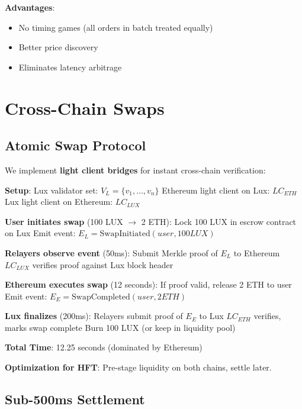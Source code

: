 \documentclass[11pt,letterpaper]{article}
\begin{document}
\textbf{Advantages}:
\begin{itemize}
    \item No timing games (all orders in batch treated equally)
    \item Better price discovery
    \item Eliminates latency arbitrage
\end{itemize}

\section{Cross-Chain Swaps}

\subsection{Atomic Swap Protocol}

We implement \textbf{light client bridges} for instant cross-chain verification:

\begin{algorithm}
\caption{Lux $\leftrightarrow$ Ethereum Atomic Swap}
\begin{algorithmic}
\STATE \textbf{Setup}:
\STATE Lux validator set: $V_L = \{v_1, \ldots, v_n\}$
\STATE Ethereum light client on Lux: $LC_{ETH}$
\STATE Lux light client on Ethereum: $LC_{LUX}$

\STATE \textbf{User initiates swap} (100 LUX $\to$ 2 ETH):
\STATE Lock 100 LUX in escrow contract on Lux
\STATE Emit event: $E_L = \text{SwapInitiated}(user, 100 LUX)$

\STATE \textbf{Relayers observe event} (50ms):
\STATE Submit Merkle proof of $E_L$ to Ethereum
\STATE $LC_{LUX}$ verifies proof against Lux block header

\STATE \textbf{Ethereum executes swap} (12 seconds):
\STATE If proof valid, release 2 ETH to user
\STATE Emit event: $E_E = \text{SwapCompleted}(user, 2 ETH)$

\STATE \textbf{Lux finalizes} (200ms):
\STATE Relayers submit proof of $E_E$ to Lux
\STATE $LC_{ETH}$ verifies, marks swap complete
\STATE Burn 100 LUX (or keep in liquidity pool)

\STATE \textbf{Total Time}: 12.25 seconds (dominated by Ethereum)
\end{algorithmic}
\end{algorithm}

\textbf{Optimization for HFT}: Pre-stage liquidity on both chains, settle later.

\subsection{Sub-500ms Settlement}
\end{document}
